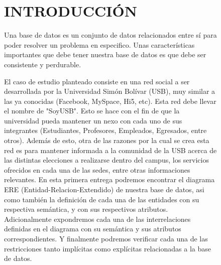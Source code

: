 \documentclass{article}
\begin{document}
\begin{figure}[h]


\newline
\newline
\newline
\newline
\newline
\newline
\newline
\newline
\newline
\newline
\author{Julio De Abreu Molina 05-38072}
\author{Rafael Beltr\'an Da Silva 07-40644}

\newpage
\tableofcontents

\newpage

\section{INTRODUCCI\'ON}

	Una base de datos es un conjunto de datos relacionados entre s\'i para poder
resolver un problema en especifico. Unas caracter\'isticas importantes que debe tener
nuestra base de datos es que debe ser consistente y perdurable.\\

\newline

	El caso de estudio planteado consiste en una red social a ser desarrollada por la Universidad Sim\'on Bol\'ivar (USB), muy similar a las ya conocidas (Facebook, MySpace, Hi5, etc). Esta red debe llevar el nombre de 
"SoyUSB". Esto se hace con el fin de que la universidad pueda mantener un nexo con cada uno de sus integrantes (Estudiantes, Profesores, Empleados, 
Egresados, entre otros). Adem\'as de esto, otra de las razones por la cual
se crea esta red es para mantener informada a la comunidad de la USB acerca de las distintas elecciones a realizarse dentro del campus, los servicios ofrecidos en cada una de las sedes, entre otras informaciones relevantes.
	En esta primera entrega podremos encontrar el diagrama ERE (Entidad-Relacion-Extendido) de nuestra base de datos, asi como tambi\'en la definici\'on de cada una de las entidades con su respectiva sem\'antica, y con sus respectivos atributos. Adicionalmente expondremos cada una de las interrelaciones definidas en el diagrama con su sem\'antica y sus atributos correspondientes. Y finalmente podremos verificar cada una de las restricciones tanto impl\'icitas como expl\'icitas relacionadas a la base de datos.\\


\end{figure}
\end{document}

